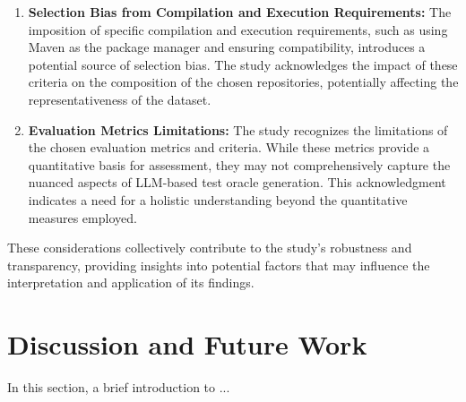 \begin{enumerate}
    \item \textbf{Selection Bias from Compilation and Execution Requirements:} The imposition of specific compilation and execution requirements, such as using Maven as the package manager and ensuring compatibility, introduces a potential source of selection bias. The study acknowledges the impact of these criteria on the composition of the chosen repositories, potentially affecting the representativeness of the dataset.

    \item \textbf{Evaluation Metrics Limitations:} The study recognizes the limitations of the chosen evaluation metrics and criteria. While these metrics provide a quantitative basis for assessment, they may not comprehensively capture the nuanced aspects of LLM-based test oracle generation. This acknowledgment indicates a need for a holistic understanding beyond the quantitative measures employed.
\end{enumerate}

These considerations collectively contribute to the study's robustness and transparency, providing insights into potential factors that may influence the interpretation and application of its findings.

\section{Discussion and Future Work}
\label{sec:discussion}
\vspace{0.2 cm}

In this section, a brief introduction to ... 




